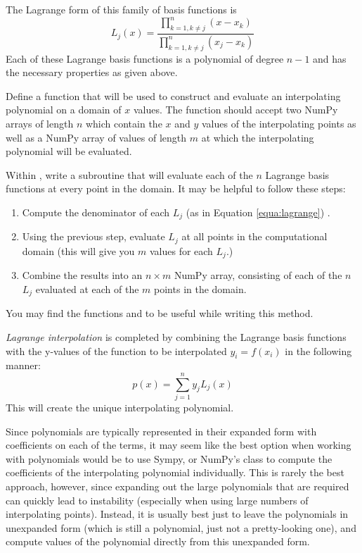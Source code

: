 The Lagrange form of this family of basis functions is
\begin{equation}
\label{equa:lagrange}
L_j(x) = \frac{\displaystyle\prod_{k=1, k \neq j}^n (x-x_k)}{\displaystyle\prod_{k=1, k \neq j}^n (x_j-x_k)}
\end{equation}
Each of these Lagrange basis functions is a polynomial of degree $n-1$ and has the necessary properties as given above.

\begin{problem}
Define a function  that will be used to construct and evaluate an interpolating polynomial on a domain of $x$ values. 
The function should accept two NumPy arrays of length $n$ which contain the $x$ and $y$ values of the interpolating points as well as a NumPy array of values of length $m$ at which the interpolating polynomial will be evaluated.

Within , write a subroutine that will evaluate each of the $n$ Lagrange basis functions at every point in the domain.
It may be helpful to follow these steps:
\begin{enumerate}
\item Compute the denominator of each $L_j$ (as in Equation \ref{equa:lagrange}) .
\item Using the previous step, evaluate $L_j$ at all points in the computational domain (this will give you $m$ values for each $L_j$.)
\item Combine the results into an  $n \times m$ NumPy array, consisting of each of the $n$ $L_j$ evaluated at each of the $m$ points in the domain.
\end{enumerate}

You may find the functions  and  to be useful while writing this method.
\label{prob:lagrange_basis}
\end{problem}

\emph{Lagrange interpolation} is completed by combining the Lagrange basis functions with the y-values of the function to be interpolated $y_i=f(x_i)$ in the following manner: 
\begin{equation}
\label{equa:poly}
p(x) = \sum_{j=1}^n y_j L_j(x)
\end{equation}
This will create the unique interpolating polynomial.

Since polynomials are typically represented in their expanded form with coefficients on each of the terms, it may seem like the best option when working with polynomials would be to use Sympy, or NumPy's
 class to compute the coefficients of the interpolating polynomial individually.
This is rarely the best approach, however, since expanding out the large polynomials that are required can quickly lead to instability (especially when using large
numbers of interpolating points).
Instead, it is usually best just to leave the polynomials in unexpanded form (which is still a polynomial, just not a pretty-looking one), and compute values of the polynomial directly from this unexpanded form.

